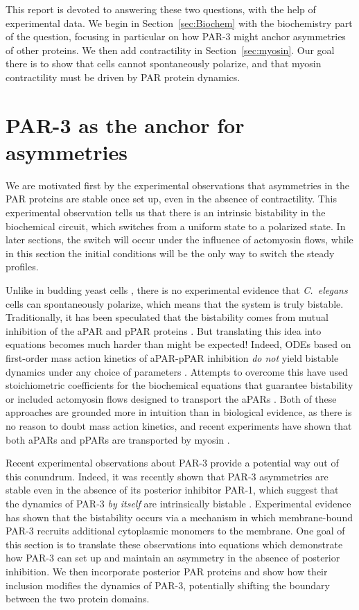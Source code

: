 \documentclass[11pt]{article}
\newcommand{\6}[1]{#1_{\text{6}}}
\newcommand{\3}[1]{#1_{\text{3}}}
\begin{document}
This report is devoted to answering these two questions, with the help of experimental data. We begin in Section\ \ref{sec:Biochem} with the biochemistry part of the question, focusing in particular on how PAR-3 might anchor asymmetries of other proteins. We then add contractility in Section\ \ref{sec:myosin}. Our goal there is to show that cells cannot spontaneously polarize, and that myosin contractility must be driven by PAR protein dynamics. 

\section{PAR-3 as the anchor for asymmetries \label{sec:Biochem}}
We are motivated first by the experimental observations that asymmetries in the PAR proteins are stable once set up, even in the absence of contractility. This experimental observation tells us that there is an intrinsic bistability in the biochemical circuit, which switches from a uniform state to a polarized state. In later sections, the switch will occur under the influence of actomyosin flows, while in this section the initial conditions will be the only way to switch the steady profiles.

Unlike in budding yeast cells \cite{mogilner2012cell}, there is no experimental evidence that \emph{C.\ elegans} cells can spontaneously polarize, which means that the system is truly bistable. Traditionally, it has been speculated that the bistability comes from mutual inhibition of the aPAR and pPAR proteins \cite{halatek2018self, trong2014parameter}. But translating this idea into equations becomes much harder than might be expected! Indeed, ODEs based on first-order mass action kinetics of aPAR-pPAR inhibition \emph{do not} yield bistable dynamics under any choice of parameters \cite{dawes20113}. Attempts to overcome this have used stoichiometric coefficients for the biochemical equations that guarantee bistability \cite{goehring2011polarization, gross2019guiding} or included actomyosin flows designed to transport the aPARs \cite{TH2008}. Both of these approaches are grounded more in intuition than in biological evidence, as there is no reason to doubt mass action kinetics, and recent experiments have shown that both aPARs and pPARs are transported by myosin \cite{illukkumbura2023design}. 

Recent experimental observations about PAR-3 provide a potential way out of this conundrum. Indeed, it was recently shown that PAR-3 asymmetries are stable even in the absence of its posterior inhibitor PAR-1, which suggest that the dynamics of PAR-3 \emph{by itself} are intrinsically bistable \cite{lang2023oligomerization}. Experimental evidence has shown that the bistability occurs via a mechanism in which membrane-bound PAR-3 recruits additional cytoplasmic monomers to the membrane. One goal of this section is to translate these observations into equations which demonstrate how PAR-3 can set up and maintain an asymmetry in the absence of posterior inhibition. We then incorporate posterior PAR proteins and show how their inclusion modifies the dynamics of PAR-3, potentially shifting the boundary between the two protein domains. 
\end{document}
